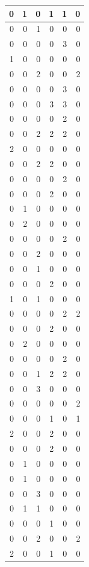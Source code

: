 \documentclass[
  12pt,
]{krantz}
\begin{document}
\begin{tabular}{r|r|r|r|r|r}
\hline
0 & 1 & 0 & 1 & 1 & 0\\
\hline
0 & 0 & 1 & 0 & 0 & 0\\
\hline
0 & 0 & 0 & 0 & 3 & 0\\
\hline
1 & 0 & 0 & 0 & 0 & 0\\
\hline
0 & 0 & 2 & 0 & 0 & 2\\
\hline
0 & 0 & 0 & 0 & 3 & 0\\
\hline
0 & 0 & 0 & 3 & 3 & 0\\
\hline
0 & 0 & 0 & 0 & 2 & 0\\
\hline
0 & 0 & 2 & 2 & 2 & 0\\
\hline
2 & 0 & 0 & 0 & 0 & 0\\
\hline
0 & 0 & 2 & 2 & 0 & 0\\
\hline
0 & 0 & 0 & 0 & 2 & 0\\
\hline
0 & 0 & 0 & 2 & 0 & 0\\
\hline
0 & 1 & 0 & 0 & 0 & 0\\
\hline
0 & 2 & 0 & 0 & 0 & 0\\
\hline
0 & 0 & 0 & 0 & 2 & 0\\
\hline
0 & 0 & 2 & 0 & 0 & 0\\
\hline
0 & 0 & 1 & 0 & 0 & 0\\
\hline
0 & 0 & 0 & 2 & 0 & 0\\
\hline
1 & 0 & 1 & 0 & 0 & 0\\
\hline
0 & 0 & 0 & 0 & 2 & 2\\
\hline
0 & 0 & 0 & 2 & 0 & 0\\
\hline
0 & 2 & 0 & 0 & 0 & 0\\
\hline
0 & 0 & 0 & 0 & 2 & 0\\
\hline
0 & 0 & 1 & 2 & 2 & 0\\
\hline
0 & 0 & 3 & 0 & 0 & 0\\
\hline
0 & 0 & 0 & 0 & 0 & 2\\
\hline
0 & 0 & 0 & 1 & 0 & 1\\
\hline
2 & 0 & 0 & 2 & 0 & 0\\
\hline
0 & 0 & 0 & 2 & 0 & 0\\
\hline
0 & 1 & 0 & 0 & 0 & 0\\
\hline
0 & 1 & 0 & 0 & 0 & 0\\
\hline
0 & 0 & 3 & 0 & 0 & 0\\
\hline
0 & 1 & 1 & 0 & 0 & 0\\
\hline
0 & 0 & 0 & 1 & 0 & 0\\
\hline
0 & 0 & 2 & 0 & 0 & 2\\
\hline
2 & 0 & 0 & 1 & 0 & 0\\

\end{tabular}
\end{document}
